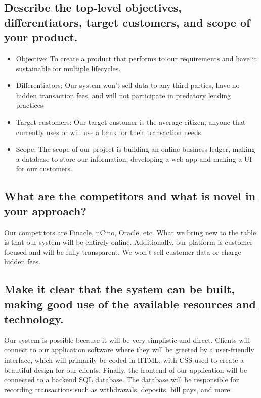 \documentclass[
10pt, %
letterpaper, %
oneside, %
headinclude,footinclude, %
BCOR5mm, %
]{scrartcl}
\begin{document}
\subsection{Describe the top-level objectives, differentiators,
target customers, and scope of your
product.}

\begin{itemize}
\item
  Objective: To create a product that performs to our requirements and
  have it sustainable for multiple lifecycles.
\item
  Differentiators: Our system won't sell data to any third parties, have
  no hidden transaction fees, and will not participate in predatory
  lending practices
\item
  Target customers: Our target customer is the average citizen, anyone
  that currently uses or will use a bank for their transaction needs.
\item
  Scope: The scope of our project is building an online business ledger,
  making a database to store our information, developing a web app and
  making a UI for our customers.
\end{itemize}

\subsection{What are the competitors and what is novel in your
approach?}

Our competitors are Finacle, nCino, Oracle, etc. What we bring new to
the table is that our system will be entirely online. Additionally, our
platform is customer focused and will be fully transparent. We won't
sell customer data or charge hidden fees.

\subsection{Make it clear that the system can be built, making good
use of the available resources and
technology.}

Our system is possible because it will be very simplistic and direct.
Clients will connect to our application software where they will be
greeted by a user-friendly interface, which will primarily be coded in
HTML, with CSS used to create a beautiful design for our clients.
Finally, the frontend of our application will be connected to a backend
SQL database. The database will be responsible for recording
transactions such as withdrawals, deposits, bill pays, and more.
\end{document}
